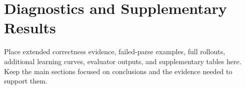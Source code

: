 \section{Diagnostics and Supplementary Results}
\label{app:diagnostics}

Place extended correctness evidence, failed-parse examples, full rollouts, additional learning curves, evaluator outputs, and supplementary tables here. Keep the main sections focused on conclusions and the evidence needed to support them.
